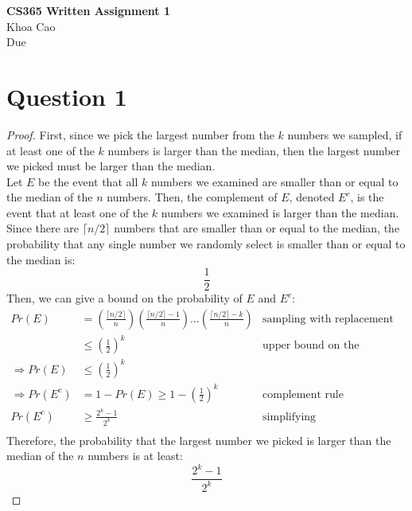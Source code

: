 \documentclass[11pt]{article}
\begin{document}
\begin{center}
    \textbf{CS365 Written Assignment 1} \\
    Khoa Cao \\
    Due 
\end{center}

\section*{Question 1}
\begin{proof}
	First, since we pick the largest number from the $k$ numbers we sampled, if at least one of the $k$ numbers is larger than the median, then the largest number we picked must be larger than the median. \\
	Let $E$ be the event that all $k$ numbers we examined are smaller than or equal to the median of the $n$ numbers. 
	Then, the complement of $E$, denoted $E^c$, is the event that at least one of the $k$ numbers we examined is larger than the median. \\
	Since there are $\lceil n/2 \rceil$ numbers that are smaller than or equal to the median, the probability that any single number we randomly select is smaller than or equal to the median is:
	\[
		\frac{1}{2}
	\]
	Then, we can give a bound on the probability of $E$ and $E^c$:
	\begin{align*}
		Pr(E) &= \left(\frac{\lceil n/2 \rceil}{n}\right) \left(\frac{\lceil n/2 \rceil - 1}{n}\right) \ldots \left(\frac{\lceil n/2 \rceil - k}{n}\right) & \text{sampling with replacement} \\
		& \leq \left( \frac{1}{2} \right)^k & \text{upper bound on the expression above} \\
		\Rightarrow Pr(E) &\leq \left( \frac{1}{2} \right)^k &  \\
		\Rightarrow Pr(E^c) &= 1 - Pr(E) \geq 1 - \left( \frac{1}{2} \right)^k & \text{complement rule} \\
		Pr(E^c) &\geq \frac{2^k - 1}{2^k} & \text{simplifying} \\
	\end{align*}
	Therefore, the probability that the largest number we picked is larger than the median of the $n$ numbers is at least:
	\[
		\frac{2^k - 1}{2^k}
	\]
\end{proof}

\newpage
\end{document}
